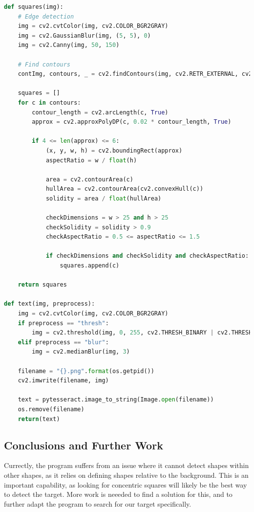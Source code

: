 \documentclass[10pt]{article}
\begin{document}
\begin{lstlisting}[language=Python]
def squares(img):
    # Edge detection
    img = cv2.cvtColor(img, cv2.COLOR_BGR2GRAY)
    img = cv2.GaussianBlur(img, (5, 5), 0)
    img = cv2.Canny(img, 50, 150)

    # Find contours
    contImg, contours, _ = cv2.findContours(img, cv2.RETR_EXTERNAL, cv2.CHAIN_APPROX_SIMPLE)

    squares = []
    for c in contours:
        contour_length = cv2.arcLength(c, True)
        approx = cv2.approxPolyDP(c, 0.02 * contour_length, True)

        if 4 <= len(approx) <= 6:
            (x, y, w, h) = cv2.boundingRect(approx)
            aspectRatio = w / float(h)

            area = cv2.contourArea(c)
            hullArea = cv2.contourArea(cv2.convexHull(c))
            solidity = area / float(hullArea)

            checkDimensions = w > 25 and h > 25
            checkSolidity = solidity > 0.9
            checkAspectRatio = 0.5 <= aspectRatio <= 1.5

            if checkDimensions and checkSolidity and checkAspectRatio:
                squares.append(c)

    return squares

def text(img, preprocess):
    img = cv2.cvtColor(img, cv2.COLOR_BGR2GRAY)
    if preprocess == "thresh":
    	img = cv2.threshold(img, 0, 255, cv2.THRESH_BINARY | cv2.THRESH_OTSU)[1]
    elif preprocess == "blur":
    	img = cv2.medianBlur(img, 3)

    filename = "{}.png".format(os.getpid())
    cv2.imwrite(filename, img)

    text = pytesseract.image_to_string(Image.open(filename))
    os.remove(filename)
    return(text)
\end{lstlisting}

\subsection{Conclusions and Further Work}
Currectly, the program suffers from an issue where it cannot detect shapes within other shapes, as it relies on defining shapes relative to the background. This is an important capability, as looking for concentric squares will likely be the best way to detect the target. More work is neeeded to find a solution for this, and to further adapt the program to search for our target specifically.
\end{document}
